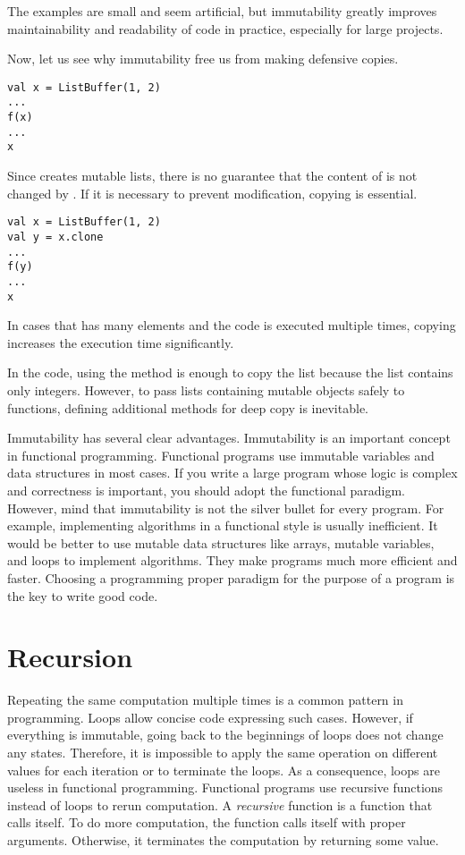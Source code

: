 The examples are small and seem artificial, but immutability greatly improves
maintainability and readability of code in practice, especially for large
projects.

Now, let us see why immutability free us from making defensive copies.

\begin{verbatim}
val x = ListBuffer(1, 2)
...
f(x)
...
x
\end{verbatim}

Since  creates mutable lists, there is no guarantee that the
content of  is not changed by . If it is necessary to prevent
modification, copying  is essential.

\begin{verbatim}
val x = ListBuffer(1, 2)
val y = x.clone
...
f(y)
...
x
\end{verbatim}

In cases that  has many elements and the code is executed multiple times,
copying  increases the execution time significantly.

In the code, using the  method is enough to copy the list because the
list contains only integers. However, to pass lists containing mutable
objects safely to functions, defining additional methods for deep copy is
inevitable.

Immutability has several clear advantages. Immutability is an important concept in
functional programming. Functional programs use immutable variables and data
structures in most cases. If you write a large program whose logic is complex
and correctness is important, you should adopt the functional paradigm.
However, mind that immutability is not the silver bullet for every
program. For example, implementing algorithms in a functional style is usually
inefficient. It would be better to use mutable data structures like arrays,
mutable variables, and loops to implement algorithms. They make
programs much more efficient and faster. Choosing a programming proper paradigm for
the purpose of a program is the key to write good code.

\section{Recursion}

Repeating the same computation multiple times is a common pattern in programming.
Loops allow concise code expressing such cases. However, if everything is
immutable, going back to the beginnings of loops does not change any states.
Therefore, it is impossible to apply the same operation on different values for
each iteration or to terminate the loops. As a consequence, loops are useless in
functional programming. Functional programs use recursive functions instead of
loops to rerun computation. A \textit{recursive}
function is a function that calls itself.
To do more computation, the function calls itself with proper arguments.
Otherwise, it terminates the computation by returning some value.

